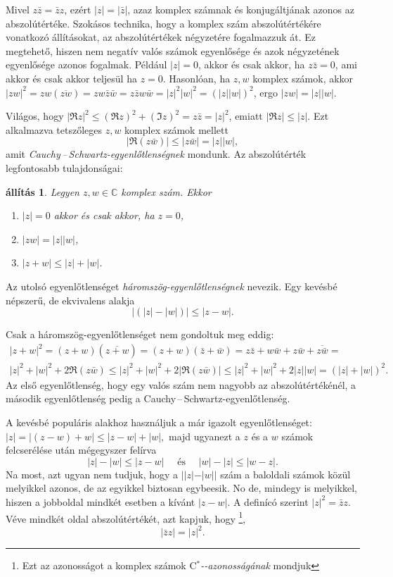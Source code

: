\documentclass[9pt, a4paper, showtrims]{memoir}
\makeatletter
\renewenvironment{proof}[1][\proofname]
    {\par\pushQED{\qed}%
    \normalfont \topsep6\p@\@plus6\p@\relax
    \trivlist
    \item[\hskip\labelsep
        \itshape
    #1\@addpunct{:}]\ignorespaces}
    {\popQED\endtrivlist\@endpefalse}
\theoremstyle{plain}
\newtheorem{proposition}{állítás}[chapter]
\theoremstyle{remark}
\theoremstyle{definition}
\newcommand{\Star}[1]{#1\ensuremath{^*}\kern-\scriptspace}
\newcommand{\CStar}{\Star{\ensuremath{\mathrm{C}}}}
\makeatother
\begin{document}
Mivel $z\bar{z}=\bar{z}z$, ezért $|z|=|\bar{z}|$, azaz komplex számnak és konjugáltjának azonos az abszolútértéke.
Szokásos technika, hogy a komplex szám abszolútértékére vonatkozó állításokat, az abszolútértékek négyzetére fogalmazzuk át.
Ez megtehető, hiszen nem negatív valós számok egyenlősége és azok négyzetének egyenlősége azonos fogalmak.
Például $|z|=0$, akkor és csak akkor, ha $z\bar{z}=0$, ami akkor és csak akkor teljesül ha $z=0$.
Hasonlóan, ha $z,w$ komplex számok, akkor $|zw|^2=zw(\overline{zw})=zw\bar{z}\bar{w}=z\bar{z}w\bar{w}=|z|^2|w|^2=\left( |z||w| \right)^2$,
ergo $|zw|=|z||w|$.

Világos, hogy $|\Re z|^2\leq(\Re z)^2+(\Im z)^2=z\bar{z}=|z|^2$, emiatt
\(
|\Re z|\leq |z|.
\)
Ezt alkalmazva tetszőleges $z,w$ komplex számok mellett
\[
	|
	\Re (z\bar{w})
	|
	\leq
	|z\bar{w}|
	=
	|z||w|,
\]
amit \emph{Cauchy\,--\,Schwartz-egyenlőtlenségnek} mondunk.
Az abszolútérték legfontosabb tulajdonságai:
\begin{proposition}
	Legyen $z,w\in\mathbb{C}$ komplex szám.
	Ekkor
	\begin{enumerate}
		\item $|z|=0$ akkor és csak akkor, ha $z=0$,
		\item $|zw|=|z||w|$,
		\item $|z+w|\leq |z|+|w|$.\qedhere
	\end{enumerate}
\end{proposition}
Az utolsó egyenlőtlenséget \emph{háromszög-egyenlőtlenségnek} nevezik.
Egy kevésbé népszerű, de ekvivalens alakja
\[
	\left|\left( |z|-|w| \right)\right|\leq|z-w|.
\]
\begin{proof}
	Csak a háromszög-egyenlőtlenséget nem gondoltuk meg eddig:
	\begin{multline*}
		|z+w|^2=
		\left( z+w \right)\left( \overline{z+w} \right)
		=
		\left( z+w \right)\left( \bar{z}+\bar{w} \right)
		=
		z\bar{z}+w\bar{w}+z\bar{w}+\overline{z\bar{w}}
		=
		\\
		|z|^2+|w|^2+2\Re (z\bar{w})
		\leq
		|z|^2+|w|^2+2|\Re (z\bar{w})|
		\leq
		|z|^2+|w|^2+2|z||w|
		=
		\left( |z|+|w| \right)^2.
	\end{multline*}
	Az első egyenlőtlenség, hogy egy valós szám nem nagyobb az abszolútértékénél,
	a második egyenlőtlenség pedig a Cauchy\,--\,Schwartz-egyenlőtlenség.

	A kevésbé populáris alakhoz használjuk a már igazolt egyenlőtlenséget:
	\begin{math}
		|z|
		=
		|(z-w)+w|
		\leq
		|z-w|+|w|,
	\end{math}
	majd ugyanezt a $z$ és a $w$ számok felcserélése után mégegyszer felírva
	\[
		|z|-|w|\leq |z-w|
		\quad\text{ és }\quad
		|w|-|z|\leq |w-z|.
	\]
	Na most, azt ugyan nem tudjuk, hogy a $||z|-|w||$ szám a baloldali számok közül melyikkel azonos,
	de az egyikkel biztosan egybeesik.
	No de, mindegy is melyikkel, hiszen a jobboldal mindkét esetben a kívánt $|z-w|$.
\end{proof}
A definícó szerint $|z|^2=\bar{z}z$.
Véve mindkét oldal abszolútértékét,
azt kapjuk, hogy%
\footnote{Ezt az azonosságot a komplex számok
	\emph{\CStar-azonosságának}\index{Ccsillag@\CStar-azonosság}
	mondjuk},
\[
	|\bar{z}z|=|z|^2.
\]%
\end{document}
